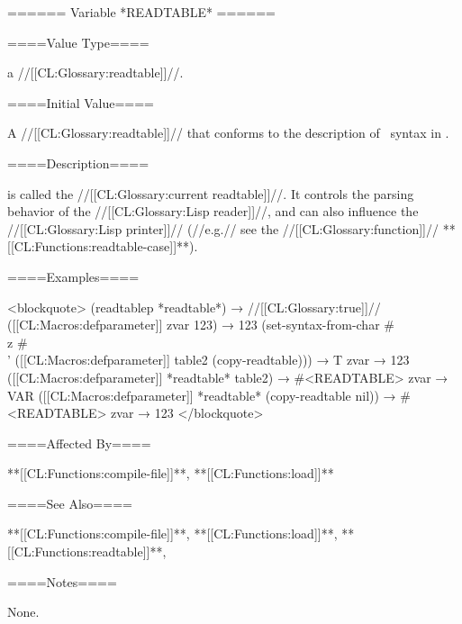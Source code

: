 ====== Variable *READTABLE* ======

====Value Type====

a //[[CL:Glossary:readtable]]//.

====Initial Value====

A //[[CL:Glossary:readtable]]// that conforms to the description of \clisp\ syntax in \chapref\Syntax.

====Description====

 is called the //[[CL:Glossary:current readtable]]//. It controls the parsing behavior of the //[[CL:Glossary:Lisp reader]]//, and can also influence the //[[CL:Glossary:Lisp printer]]// (//e.g.// see the //[[CL:Glossary:function]]// **[[CL:Functions:readtable-case]]**).

====Examples====

<blockquote> (readtablep *readtable*) → //[[CL:Glossary:true]]// ([[CL:Macros:defparameter]] zvar 123) → 123 (set-syntax-from-char #\\z #\\' ([[CL:Macros:defparameter]] table2 (copy-readtable))) → T zvar → 123 ([[CL:Macros:defparameter]] *readtable* table2) → #<READTABLE> zvar → VAR ([[CL:Macros:defparameter]] *readtable* (copy-readtable nil)) → #<READTABLE> zvar → 123 </blockquote>

====Affected By====

**[[CL:Functions:compile-file]]**, **[[CL:Functions:load]]**

====See Also====

**[[CL:Functions:compile-file]]**, **[[CL:Functions:load]]**, **[[CL:Functions:readtable]]**, {\secref\CurrentReadtable}

====Notes====

None.

